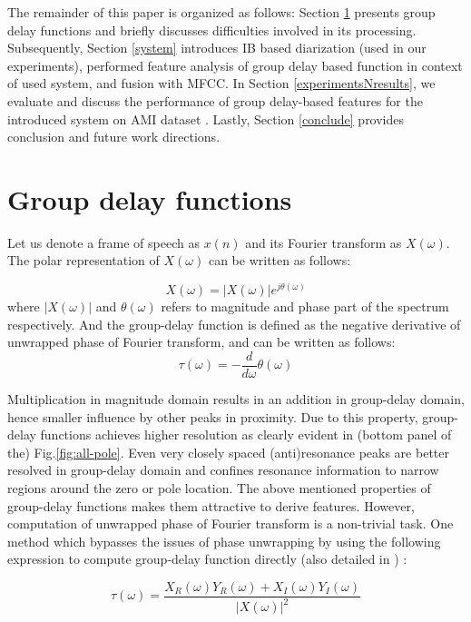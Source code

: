 \documentclass[conference]{IEEEtran}
\begin{document}
The remainder of this paper is organized as follows: Section \ref{fe} presents
group delay functions and briefly discusses difficulties involved in its
processing. Subsequently, Section \ref{system} introduces IB based diarization
(used in our experiments), performed feature analysis of group delay based
function in context of used system, and fusion with MFCC. In Section
\ref{experimentsNresults}, we evaluate and discuss the performance of group
delay-based features for the introduced system on AMI dataset \cite{AMIData}.
Lastly, Section \ref{conclude} provides conclusion and future work directions.    

\section{Group delay functions}
\label{fe}
Let us denote a frame of speech as $x(n)$ and its Fourier transform as
$X(\omega)$. The polar representation of $X(\omega)$ can be written as follows:

\begin{equation}
X(\omega) = |X(\omega)| e^{j\theta(\omega)} 
\label{equ:FT}
\end{equation}     
where $|X(\omega)|$ and $\theta(\omega)$ refers to magnitude and phase part of
the spectrum respectively. And the group-delay function is defined as the
negative derivative of unwrapped phase of Fourier transform, and can be written
as follows: 
\begin{equation}
\tau(\omega) =  - \frac{d}{d\omega} \theta(\omega)
\label{equ:GDF_def}
\end{equation}

Multiplication in magnitude domain results in an addition in group-delay domain,
hence smaller influence by other peaks in proximity. Due to this property,
group-delay functions achieves higher resolution as clearly evident in (bottom
panel of the) Fig.\ref{fig:all-pole}. Even very closely spaced (anti)resonance
peaks are better resolved in group-delay domain and confines resonance
information to narrow regions around the zero or pole location. The above
mentioned properties of group-delay functions makes them attractive to derive
features. However, computation of unwrapped phase of Fourier transform is a
non-trivial task. One method which bypasses the issues of phase unwrapping by
using the following expression to compute group-delay function directly (also
detailed in \cite{gdSurvey}) :

\begin{equation}
\tau(\omega) = \frac{X_R(\omega)Y_R(\omega) + X_I(\omega)Y_I(\omega)}{|X(\omega)|^{2}}
\label{eq:GDF_com}
\end{equation}
\end{document}
